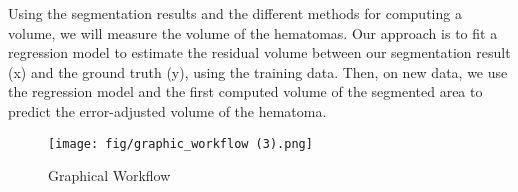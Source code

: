 \documentclass[11pt, journal, a4paper]{IEEEtran}
\begin{document}
Using the segmentation results and the different methods for computing a volume, we will measure the volume of the hematomas. Our approach is to fit a regression model to estimate the residual volume between our segmentation result (x) and the ground truth (y), using the training data. Then, on new data, we use the regression model and the first computed volume of the segmented area to predict the error-adjusted volume of the hematoma.
\begin{figure*}[ht]
    \centering
    \texttt{[image: fig/graphic\_workflow (3).png]}
\caption{Graphical Workflow}
    \label{fig1}
\end{figure*}



\newpage



\newpage
\end{document}
